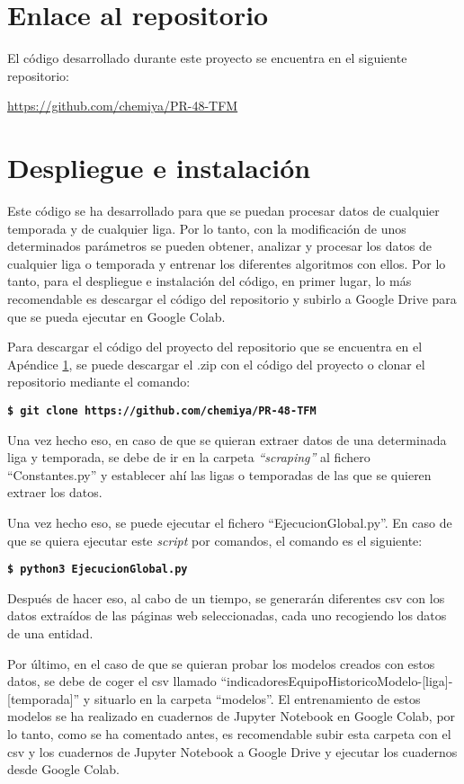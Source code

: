



\section{Enlace al repositorio}
\label{enlace-repo}
El código desarrollado durante este proyecto se encuentra en el siguiente repositorio:


\url{https://github.com/chemiya/PR-48-TFM}  

\section{Despliegue e instalación}
Este código se ha desarrollado para que se puedan procesar datos de cualquier temporada y de cualquier liga. Por lo tanto, con la modificación de unos determinados parámetros se pueden obtener, analizar y procesar los datos de cualquier liga o temporada y entrenar los diferentes algoritmos con ellos. 
Por lo tanto, para el despliegue e instalación del código, en primer lugar, lo más recomendable es descargar el código del repositorio y subirlo a Google Drive para que se pueda ejecutar en Google Colab. 

Para descargar el código del proyecto del repositorio que se encuentra en el Apéndice \ref{enlace-repo}, se puede descargar el .zip con el código del proyecto o clonar el repositorio mediante el comando:
    
\textbf{\texttt{\$  git clone https://github.com/chemiya/PR-48-TFM }   }   

Una vez hecho eso, en caso de que se quieran extraer datos de una determinada liga y temporada, se debe de ir en la carpeta \textit{``scraping''} al fichero ``Constantes.py'' y establecer ahí las ligas o temporadas de las que se quieren extraer los datos. 

Una vez hecho eso, se puede ejecutar el fichero ``EjecucionGlobal.py''. En caso de que se quiera ejecutar este \textit{script} por comandos, el comando es el siguiente:

\textbf{\texttt{\$  python3 EjecucionGlobal.py}   }   

Después de hacer eso, al cabo de un tiempo, se generarán diferentes csv con los datos extraídos de las páginas web seleccionadas, cada uno recogiendo los datos de una entidad. 

Por último, en el caso de que se quieran probar los modelos creados con estos datos, se debe de coger el csv llamado ``indicadoresEquipoHistoricoModelo-[liga]-[temporada]'' y situarlo en la carpeta ``modelos''. El entrenamiento de estos modelos se ha realizado en cuadernos de Jupyter Notebook en Google Colab, por lo tanto, como se ha comentado antes, es recomendable subir esta carpeta con el csv y los cuadernos de Jupyter Notebook a Google Drive y ejecutar los cuadernos desde Google Colab.
